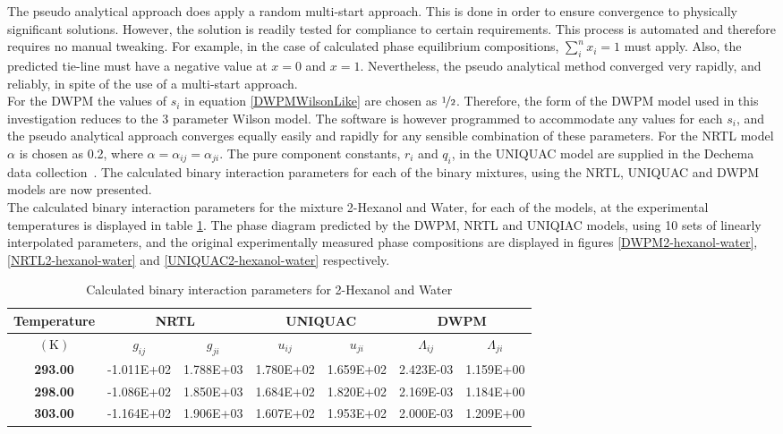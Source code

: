 The pseudo analytical approach does apply a random multi-start approach. This is done in order to ensure convergence to physically significant solutions. However, the solution is readily tested for compliance to certain requirements. This process is automated and therefore requires no manual tweaking. For example, in the case of calculated phase equilibrium compositions, $\sum_{i}^{n} x_{i} = 1$ must apply. Also, the predicted tie-line must have a negative value at $x=0$ and $x=1$. Nevertheless, the pseudo analytical method converged very rapidly, and reliably, in spite of the use of a multi-start approach.\\

For the DWPM the values of $s_{i}$ in equation \ref{DWPMWilsonLike} are chosen as $\nicefrac{1}{2}$. Therefore, the form of the DWPM model used in this investigation reduces to the 3 parameter Wilson model. The software is however programmed to accommodate any values for each $s_{i}$, and the pseudo analytical approach converges equally easily and rapidly for any sensible combination of these parameters. For the NRTL model $\alpha$ is chosen as 0.2, where $\alpha= \alpha_{ij}=\alpha_{ji}$. The pure component constants, $r_{i}$ and $q_{i}$, in the UNIQUAC model are supplied in the Dechema data collection~\cite{Dechema}. The calculated binary interaction parameters for each of the binary mixtures, using the NRTL, UNIQUAC and DWPM models are now presented.\\



The calculated binary interaction parameters for the mixture 2-Hexanol and Water, for each of the models, at the experimental temperatures is displayed in table \ref{2HexanolWaterTable}. The phase diagram predicted by the DWPM, NRTL and UNIQIAC models, using 10 sets of linearly interpolated parameters, and the original experimentally measured phase compositions are displayed in figures \ref{DWPM2-hexanol-water}, \ref{NRTL2-hexanol-water} and \ref{UNIQUAC2-hexanol-water} respectively.\\

\begin{table}
\begin{tabularx}{\textwidth}{c|cc|cc|cc}
\hline
\textbf{Temperature}&\multicolumn{2}{c|}{\textbf{NRTL}}&\multicolumn{2}{c|}{\textbf{UNIQUAC}}&\multicolumn{2}{c}{\textbf{DWPM}}\\
\hline
\hline
$\left(\mathrm{K}\right)$&$g_{ij}$&$g_{ji}$&$u_{ij}$&$u_{ji}$&$\Lambda_{ij}$&$\Lambda_{ji}$\\
\hline
\textbf{ 293.00 } & -1.011E+02 & 1.788E+03 & 1.780E+02 & 1.659E+02 & 2.423E-03 & 1.159E+00\\
\textbf{ 298.00 } & -1.086E+02 & 1.850E+03 & 1.684E+02 & 1.820E+02 & 2.169E-03 & 1.184E+00\\
\textbf{ 303.00 } & -1.164E+02 & 1.906E+03 & 1.607E+02 & 1.953E+02 & 2.000E-03 & 1.209E+00\\
\hline 
\end{tabularx}\\
\caption{Calculated binary interaction parameters for 2-Hexanol and Water} \label{2HexanolWaterTable}
\end{table}

